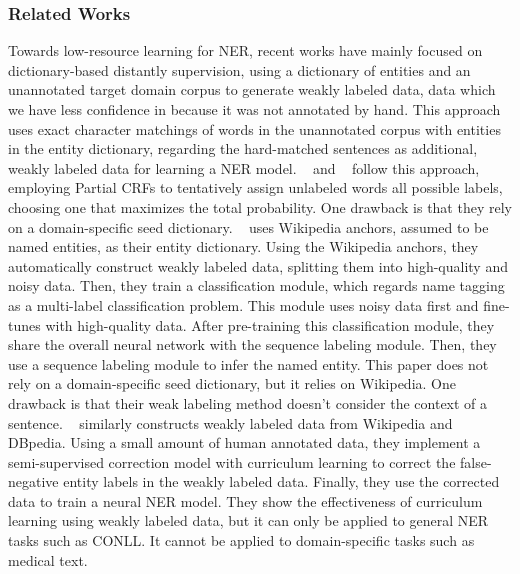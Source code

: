\subsubsection{Related Works}
Towards low-resource learning for NER,
recent works have mainly focused on dictionary-based distantly supervision, using a dictionary of entities and an unannotated target domain corpus to generate weakly labeled data, data which we have less confidence in because it was not annotated by hand. This approach uses exact character matchings of words in the unannotated corpus with entities in the entity dictionary, regarding the hard-matched sentences as additional, weakly labeled data for learning a NER model. 
~\cite{autoner} and ~\cite{yangner} follow this approach, employing Partial CRFs to tentatively assign unlabeled words all possible labels, choosing one that maximizes the total probability. One drawback is that they rely on a domain-specific seed dictionary. 
~\cite{weakcrf} uses Wikipedia anchors, assumed to be named entities, as their entity dictionary. Using the Wikipedia anchors, they automatically construct weakly labeled data, splitting them into high-quality and noisy data. Then, they train a classification module, which regards name tagging as a multi-label classification problem. This module uses noisy data first and fine-tunes with high-quality data. After pre-training this classification module, they share the overall neural network with the sequence labeling module. Then, they use a sequence labeling module to infer the named entity. This paper does not rely on a domain-specific seed dictionary, but it relies on Wikipedia. One drawback is that their weak labeling method doesn't consider the context of a sentence.
~\cite{opencorrection} similarly constructs weakly labeled data from Wikipedia and DBpedia. Using a small amount of human annotated data, they implement a semi-supervised correction model with curriculum learning to correct the false-negative entity labels in the weakly labeled data. Finally, they use the corrected data to train a neural NER model. They show the effectiveness of curriculum learning using weakly labeled data, but it can only be applied to general NER tasks such as CONLL. It cannot be applied to domain-specific tasks such as medical text.

